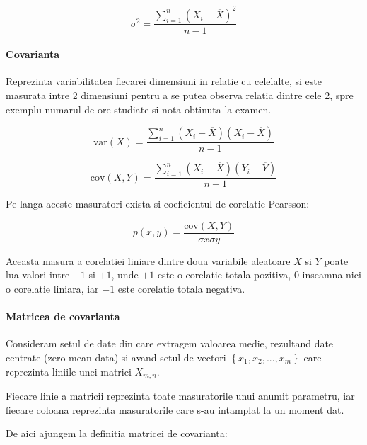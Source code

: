 \documentclass[12pt,oneside]{article}
\begin{document}
\begin{equation}
\sigma^2=\frac{\sum_{i=1}^{n} \left( X_i - \overline{X} \right)^2 }{n-1}
\end{equation}


\paragraph{Covarianta} Reprezinta variabilitatea fiecarei dimensiuni in relatie cu celelalte, si este masurata intre 2 dimensiuni pentru a se putea observa relatia dintre cele 2, spre exemplu numarul de ore studiate si nota obtinuta la examen.

\begin{equation}
\text {var} \left( X \right) = \frac{\sum_{i=1}^{n} \left( X_i - \overline{X} \right) \left( X_i - \overline{X} \right) }{n-1}
\end{equation}


\begin{equation}
\text {cov} \left( X,Y \right) = \frac{\sum_{i=1}^{n} \left( X_i - \overline{X} \right) \left( Y_i - \overline{Y} \right) }{n-1}
\end{equation}

Pe langa aceste masuratori exista si coeficientul de corelatie Pearsson:

\begin{equation}
	p(x,y)=\frac{\text{cov}(X,Y)}{\sigma x \sigma y}
\end{equation}

Aceasta masura a corelatiei liniare dintre doua variabile aleatoare $X$ si $Y$ poate lua valori intre $-1$ si $+1$, unde $+1$ este o corelatie totala pozitiva, $0$ inseamna nici o corelatie liniara, iar $-1$ este corelatie totala negativa.\cite{pearsson_correlation_coefficient_wiki}

\paragraph{Matricea de covarianta}
Consideram setul de date din care extragem valoarea medie, rezultand date centrate (zero-mean data) si avand setul de vectori \( \left\{ x_1, x_2, ..., x_m \right\} \) care reprezinta liniile unei matrici $X_{m,n}$.

Fiecare linie a matricii reprezinta toate masuratorile unui anumit parametru, iar fiecare coloana reprezinta masuratorile care s-au intamplat la un moment dat.

De aici ajungem la definitia matricei de covarianta:
\end{document}
